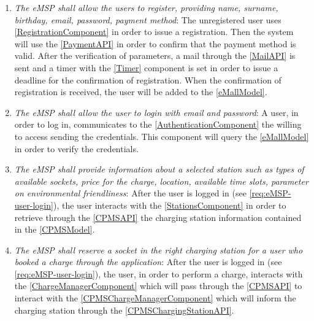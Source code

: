 \begin{enumerate}[label=\textbf{R\arabic*}]
    \item \textit{The \ac{eMSP} shall allow the users to register, providing name, surname, birthday, email, password, payment method}:
          The unregistered user uses \ref{RegistrationComponent} in order to issue a registration.
          Then the system will use the \ref{PaymentAPI} in order to confirm that the payment method is valid.
          After the verification of parameters, a mail through the \ref{MailAPI} is sent and a timer with the \ref{Timer} component is set in order to issue a deadline for the confirmation of registration.
          When the confirmation of registration is received, the user will be added to the \ref{eMallModel}.
          \label{req:eMSP-user-registration}
    \item \textit{The \ac{eMSP} shall allow the user to login with email and password}:
          A user, in order to log in, communicates to the \ref{AuthenticationComponent} the willing to access sending the credentials. This component will query the \ref{eMallModel} in order to verify the credentials.
          \label{req:eMSP-user-login}
    \item \textit{The \ac{eMSP} shall provide information about a selected station such as types of available sockets, price for the charge, location, available time slots, parameter on environmental friendliness}:
          After the user is logged in (see \ref{req:eMSP-user-login}), the user interacts with the \ref{StationsComponent} in order to retrieve through the \ref{CPMSAPI} the charging station information contained in the \ref{CPMSModel}.
          \label{req:eMSP-info-station}
    \item \textit{The \ac{eMSP} shall reserve a socket in the right charging station for a user who booked a charge through the application}:
          After the user is logged in (see \ref{req:eMSP-user-login}), the user, in order to perform a charge, interacts with the \ref{ChargeManagerComponent} which will pass through the \ref{CPMSAPI} to interact with the \ref{CPMSChargeManagerComponent} which will inform the charging station through the \ref{CPMSChargingStationAPI}.

\end{enumerate}
